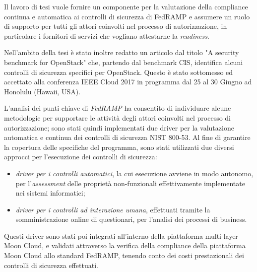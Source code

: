 \documentclass[../main.tex]{subfiles}
\begin{document}
Il lavoro di tesi vuole fornire un componente per la valutazione della compliance continua e automatica ai controlli di sicurezza di FedRAMP e assumere un ruolo di supporto per tutti gli attori coinvolti nel processo di autorizzazione, in particolare i fornitori di servizi che vogliano attestarne la \textit{readiness}.

Nell'ambito della tesi è stato inoltre redatto un articolo dal titolo "A security benchmark for OpenStack" che, partendo dal benchmark CIS, identifica alcuni controlli di sicurezza specifici per OpenStack.
Questo è stato sottomesso ed accettato alla conferenza IEEE Cloud 2017 in programma dal 25 al 30 Giugno  ad Honolulu (Hawaii, USA).


L'analisi dei punti chiave di \textit{FedRAMP} ha consentito di individuare alcune metodologie per supportare le attività degli attori coinvolti nel processo di autorizzazione; sono stati quindi implementati due driver per la valutazione automatica e continua dei controlli di sicurezza NIST 800-53.
Al fine di garantire la copertura delle specifiche del programma, sono stati utilizzati due diversi approcci per l'esecuzione dei controlli di sicurezza:
\begin{itemize}
\item \textit{driver per i controlli automatici}, la cui esecuzione avviene in modo autonomo, per l'\textit{assessment} delle proprietà non-funzionali effettivamente implementate nei sistemi informatici;
\item \textit{driver per i controlli ad interazione umana}, effettuati tramite la somministrazione online di questionari, per l'analisi dei processi di business.
\end{itemize}
Questi driver sono stati poi integrati all'interno della piattaforma multi-layer Moon Cloud, e validati attraverso la verifica della compliance della piattaforma Moon Cloud allo standard FedRAMP, tenendo conto dei costi prestazionali dei controlli di sicurezza effettuati.
\end{document}
